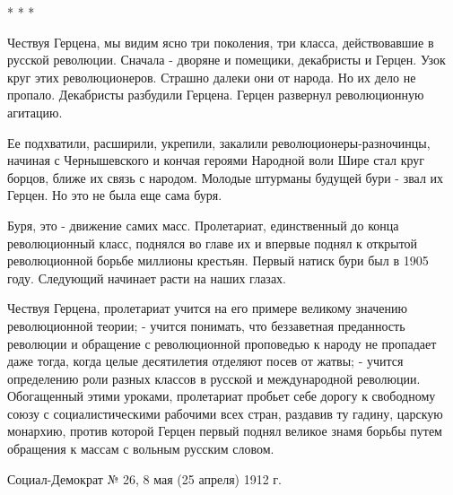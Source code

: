 \documentclass[12pt]{article}
\newcommand{\parnum}{(\arabic{parcount})}
\newcounter{parcount}
\newenvironment{parnumbers}{%
  \par%
  \everypar{\noindent \stepcounter{parcount}\marginpar[]{\parnum}}%
}{}
\begin{document}
* * *

\begin{parnumbers}
Чествуя Герцена, мы видим ясно три поколения, три класса, действовавшие в русской революции. Сначала - дворяне и помещики, декабристы и Герцен. Узок круг этих революционеров. Страшно далеки они от народа. Но их дело не пропало. Декабристы разбудили Герцена. Герцен развернул революционную агитацию.

Ее подхватили, расширили, укрепили, закалили революционеры-разночинцы, начиная с Чернышевского и кончая героями Народной воли Шире стал круг борцов, ближе их связь с народом. Молодые штурманы будущей бури - звал их Герцен. Но это не была еще сама буря.

Буря, это - движение самих масс. Пролетариат, единственный до конца революционный класс, поднялся во главе их и впервые поднял к открытой революционной борьбе миллионы крестьян. Первый натиск бури был в 1905 году. Следующий начинает расти на наших глазах.

Чествуя Герцена, пролетариат учится на его примере великому значению революционной теории; - учится понимать, что беззаветная преданность революции и обращение с революционной проповедью к народу не пропадает даже тогда, когда целые десятилетия отделяют посев от жатвы; - учится определению роли разных классов в русской и международной революции. Обогащенный этими уроками, пролетариат пробьет себе дорогу к свободному союзу с социалистическими рабочими всех стран, раздавив ту гадину, царскую монархию, против которой Герцен первый поднял великое знамя борьбы путем обращения к массам с вольным русским словом.
\end{parnumbers}

Социал-Демократ № 26, 8 мая (25 апреля) 1912 г.
\end{document}
